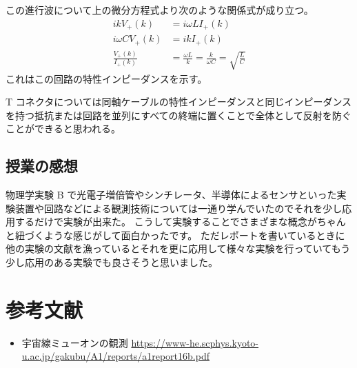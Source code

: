 \documentclass[uplatex,dvipdfmx,a4paper,11pt]{jlreq}
\numberwithin{equation}{section}
\theoremstyle{definition}
\begin{document}
この進行波について上の微分方程式より次のような関係式が成り立つ。
\begin{align}
  ikV_+(k)              & = i\omega LI_+(k)                                              \\
  i\omega CV_+(k)       & = ikI_+(k)                                                     \\
  \frac{V_+(k)}{I_+(k)} & = \frac{\omega L}{k} = \frac{k}{\omega C} = \sqrt{\frac{L}{C}}
\end{align}
これはこの回路の特性インピーダンスを示す。

T コネクタについては同軸ケーブルの特性インピーダンスと同じインピーダンスを持つ抵抗または回路を並列にすべての終端に置くことで全体として反射を防ぐことができると思われる。


\subsection{授業の感想}
物理学実験 B で光電子増倍管やシンチレータ、半導体によるセンサといった実験装置や回路などによる観測技術については一通り学んでいたのでそれを少し応用するだけで実験が出来た。
こうして実験することでさまざまな概念がちゃんと紐づくような感じがして面白かったです。
ただレポートを書いているときに他の実験の文献を漁っているとそれを更に応用して様々な実験を行っていてもう少し応用のある実験でも良さそうと思いました。

\section{参考文献}
\begin{itemize}
  \item 宇宙線ミューオンの観測 \url{https://www-he.scphys.kyoto-u.ac.jp/gakubu/A1/reports/a1report16b.pdf}
\end{itemize}
\end{document}
